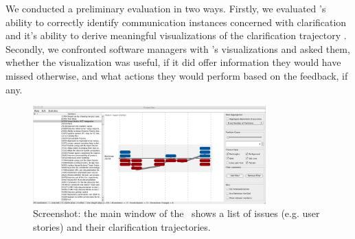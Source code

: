 We conducted a preliminary evaluation in two ways. Firstly, we evaluated \viss's ability to correctly identify communication instances concerned with clarification and it's ability to derive meaningful visualizations of the clarification trajectory \cite{Knauss2012f}. 
Secondly, we confronted software managers with \viss's visualizations and asked them, whether the visualization was useful, if it did offer information they would have missed otherwise, and what actions they would perform based on the feedback, if any. 

\begin{figure}
\centering
\includegraphics[width=0.8\textwidth]{img/vissuelizer-screenshot}
\caption{Screenshot: the main window of the \viss\ shows a list of issues (e.g. user stories) and their clarification trajectories.}
\label{fig:screenshot}
\end{figure}